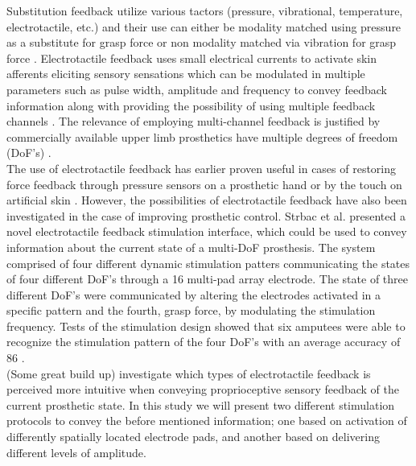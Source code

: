 Substitution feedback utilize various tactors (pressure, vibrational, temperature, electrotactile, etc.) and their use can either be modality matched using pressure as a substitute for grasp force \cite{Godfrey2017} or non modality matched via vibration for grasp force \cite{Ninu2014,Nabeel2016}. 
Electrotactile feedback uses small electrical currents to activate skin afferents eliciting sensory sensations which can be modulated in multiple parameters such as pulse width, amplitude and frequency to convey feedback information along with providing the possibility of using multiple feedback channels \cite{Geng2012}. The relevance of employing multi-channel feedback is justified by commercially available upper limb prosthetics have multiple degrees of freedom (DoF's) \cite{Cordella2016}. \\
%
The use of electrotactile feedback has earlier proven useful in cases of restoring force feedback through pressure sensors on a prosthetic hand or by the touch on artificial skin \cite{Hartmann2014,Franceschi2015}. However, the possibilities of electrotactile feedback have also been investigated in the case of improving prosthetic control. Strbac et al. \cite{Strbac2016} presented a novel electrotactile feedback stimulation interface, which could be used to convey information about the current state of a multi-DoF prosthesis. The system comprised of four different dynamic stimulation patters communicating the states of four different DoF's through a 16 multi-pad array electrode. The state of three different DoF's were communicated by altering the electrodes activated in a specific pattern and the fourth, grasp force, by modulating the stimulation frequency. Tests of the stimulation design showed that six amputees were able to recognize the stimulation pattern of the four DoF's with an average accuracy of 86 \percent. \cite{Strbac2016} \\   
%
(Some great build up) investigate which types of electrotactile feedback is perceived more intuitive when conveying proprioceptive sensory feedback of the current prosthetic state. In this study we will present two different stimulation protocols to convey the before mentioned information; one based on activation of differently spatially located electrode pads, and another based on delivering different levels of amplitude.      


 
